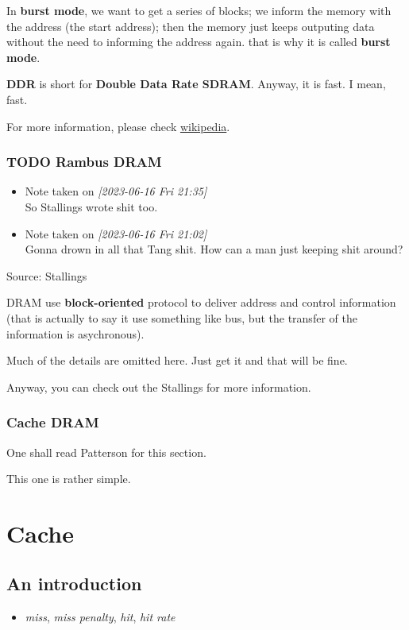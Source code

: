 \documentclass[11pt]{article}
\begin{document}
In \textbf{burst mode}, we want to get a series of blocks; we inform the memory with the address (the start address); then the memory just keeps outputing data without the need to informing the address again. that is why it is called \textbf{burst mode}.

\textbf{DDR} is short for \textbf{Double Data Rate SDRAM}. Anyway, it is fast. I mean, fast.

For more information, please check \href{https:google.com/search?q=burstmode}{wikipedia}.

\subsubsection{{\bfseries\sffamily TODO} Rambus DRAM}
\label{sec:org062e262}
\begin{itemize}
\item Note taken on \textit{[2023-06-16 Fri 21:35] } \\
So Stallings wrote shit too.
\item Note taken on \textit{[2023-06-16 Fri 21:02] } \\
Gonna drown in all that Tang shit. How can a man just keeping shit around?
\end{itemize}

Source: Stallings

DRAM use \textbf{block-oriented} protocol to deliver address and control information (that is actually to say it use something like bus, but the transfer of the information is asychronous). 

Much of the details are omitted here. Just get it and that will be fine. 

Anyway, you can check out the Stallings for more information.

\subsubsection{Cache DRAM}
\label{sec:org2e6f3fb}

One shall read Patterson for this section.

This one is rather simple.

\section{Cache}
\label{sec:org6451d77}
\subsection{An introduction}
\label{sec:orgec6cbe8}
\begin{itemize}
\item \emph{miss}, \emph{miss penalty}, \emph{hit}, \emph{hit rate}
\end{itemize}
\end{document}

